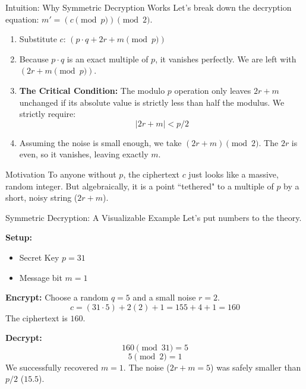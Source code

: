 \documentclass[10pt,handout]{beamer}
\begin{document}
\begin{frame}{Intuition: Why Symmetric Decryption Works}
    Let's break down the decryption equation: $m' = (c \pmod p) \pmod 2$.
    \pause
    
    \vspace{0.3cm}
    \begin{enumerate}
        \item Substitute $c$: $(p \cdot q + 2r + m \pmod p)$
        \pause
        \item Because $p \cdot q$ is an exact multiple of $p$, it vanishes perfectly. We are left with $(2r + m \pmod p)$.
        \pause
        \item \textbf{The Critical Condition:} The modulo $p$ operation only leaves $2r+m$ unchanged if its absolute value is strictly less than half the modulus. We strictly require:
        $$|2r + m| < p/2$$
        \pause
        \item Assuming the noise is small enough, we take $(2r + m) \pmod 2$. The $2r$ is even, so it vanishes, leaving exactly $m$.
    \end{enumerate}
    \pause
    
    \begin{block}{Motivation}
    To anyone without $p$, the ciphertext $c$ just looks like a massive, random integer. But algebraically, it is a point ``tethered" to a multiple of $p$ by a short, noisy string ($2r+m$).
    \end{block}
\end{frame}

\begin{frame}{Symmetric Decryption: A Visualizable Example}
    Let's put numbers to the theory.
    
    \vspace{0.2cm}
    \textbf{Setup:}
    \begin{itemize}
        \item Secret Key $p = 31$
        \item Message bit $m = 1$
    \end{itemize}
    \pause
    
    \textbf{Encrypt:}
    Choose a random $q = 5$ and a small noise $r = 2$.
    $$c = (31 \cdot 5) + 2(2) + 1 = 155 + 4 + 1 = 160$$
    The ciphertext is $160$.
    \pause
    
    \vspace{0.2cm}
    \textbf{Decrypt:}
    $$160 \pmod{31} = 5$$
    $$5 \pmod 2 = 1$$
    We successfully recovered $m = 1$. The noise ($2r+m = 5$) was safely smaller than $p/2$ ($15.5$).
\end{frame}
\end{document}
